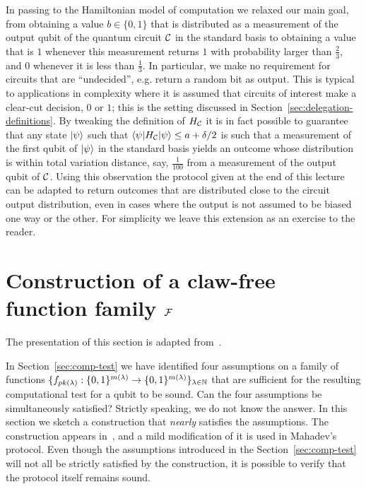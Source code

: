 \begin{remark}
In passing to the Hamiltonian model of computation we relaxed our main goal,  from obtaining a value $b \in \{0,1\}$ that is distributed as a measurement of the output qubit of the quantum circuit $\mathcal{C}$ in the standard basis to obtaining a value that is $1$ whenever this measurement returns $1$ with probability larger than $\frac{2}{3}$, and $0$ whenever it is less than $\frac{1}{3}$. In particular, we make no requirement for circuits that are ``undecided'', e.g. return a random bit as output. This is typical to applications in complexity where it is assumed that circuits of interest make a clear-cut decision, $0$ or $1$; this is the setting discussed in Section~\ref{sec:delegation-definitions}. By tweaking the definition of $H_{\mathcal{C}}$ it is in fact possible to guarantee that any state $|\psi\rangle$ such that $\langle\psi| H_{\mathcal{C}} |\psi\rangle \leq a + \delta/2$ is such that a measurement of the first qubit of $|\psi\rangle$ in the standard basis yields an outcome whose distribution is within total variation distance, say, $\frac{1}{100}$ from a measurement of the output qubit of $\mathcal{C}$. Using this observation the protocol given at the end of this lecture can be adapted to return outcomes that are distributed close to the circuit output distribution, even in cases where the output is not assumed to be biased one way or the other. For simplicity we leave this extension as an exercise to the reader. 
\end{remark}

\section{Construction of a claw-free function family $\mathcal{F}$}

The presentation of this section is adapted from~\cite{vidick2020verifying}. 

In Section~\ref{sec:comp-test} we have identified four assumptions on a family of functions $\{f_{pk(\lambda)}:\{0,1\}^{m(\lambda)}\to\{0,1\}^{m(\lambda)}\}_{\lambda\in\mathbb{N}}$ that are sufficient for the resulting computational test for a qubit to be sound. Can the four assumptions be simultaneously satisfied? Strictly speaking, we do not know the answer. In this section we sketch a construction that \emph{nearly} satisfies the assumptions. The construction appears in~\cite{brakerski2018cryptographic}, and a mild modification of it is used in Mahadev's protocol. Even though the assumptions introduced in the Section~\ref{sec:comp-test} will not all be strictly satisfied by the construction, it is possible to verify that the protocol itself remains sound.

